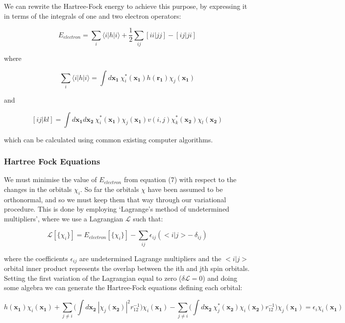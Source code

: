 \documentclass[10pt]{article}
\begin{document}
We can rewrite the Hartree-Fock energy to achieve this purpose, by expressing it in terms of the integrals of one and two electron operators:

\begin{equation}
	E_{electron} = \sum_{i}\langle i|h|i\rangle + \frac{1}{2}\sum_{ij}[ii|jj]-[ij|ji]
\end{equation}

where

$$\sum_{i}\langle i|h|i\rangle = \int d\mathbf{x_1} \ \chi^*_i(\mathbf{x_1})h(\mathbf{r_1})\chi_j(\mathbf{x_1})$$

and

$$[ij|kl] = \int d\mathbf{x_1} d\mathbf{x_2} \ \chi^*_i(\mathbf{x_1})\chi_j(\mathbf{x_1})v(i,j)\chi^*_k(\mathbf{x_2})\chi_l(\mathbf{x_2})$$

which can be calculated using common existing computer algorithms.

\subsubsection{Hartree Fock Equations}
We must minimise the value of $E_{electron}$ from equation (7) with respect to the changes in the orbitals $\chi_i$. So far the orbitals $\chi$ have been assumed to be orthonormal, and so we must keep them that way through our variational procedure. This is done by employing `Lagrange's method of undetermined multipliers', where we use a Lagrangian $\mathcal{L}$ such
that:

\begin{equation*}
	\mathcal{L}[\{\chi_i\}] = E_{electron}[\{\chi_i\}]-\sum_{ij}\epsilon_{ij}(<i|j>- \ \delta_{ij})
\end{equation*}

where the coefficients $\epsilon_{ij}$ are undetermined Lagrange multipliers and the $<i|j>$ orbital inner product represents the overlap between the ith and jth spin orbitals. Setting the first variation of the Lagrangian equal to zero ($\delta\mathcal{L} = 0$) and doing some algebra we can generate the Hartree-Fock equations defining each orbital:

\begin{equation}
	h(\mathbf{x_1})\chi_i(\mathbf{x_1})+\sum_{j \not= i}\biggr(\int d\mathbf{x_2} \ |\chi_j(\mathbf{x_2})|^2r_{12}^{-1}\biggr)\chi_i(\mathbf{x_1})-\sum_{j \not= i}\biggr(\int d\mathbf{x_2} \ \chi_j^*(\mathbf{x_2})\chi_i(\mathbf{x_2})r_{12}^{-1}\biggr)\chi_j(\mathbf{x_1}) = \epsilon_i\chi_i(\mathbf{x_1})
\end{equation}
\end{document}
